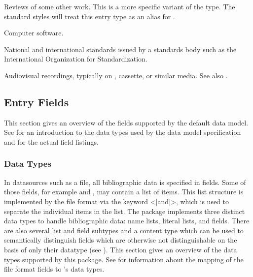 \documentclass{ltxdockit}[2011/03/25]
\begin{document}
\begin{typelist}

Reviews of some other work. This is a more specific variant of the  type. The standard styles will treat this entry type as an alias for .


Computer software.


National and international standards issued by a standards body such as the International Organization for Standardization.


Audiovisual recordings, typically on ,  cassette, or similar media. See also .

\end{typelist}

\subsection{Entry Fields}
\label{bib:fld}

This section gives an overview of the fields supported by the  default data model. See  for an introduction to the data types used by the data model specification and  for the actual field listings.

\subsubsection{Data Types}
\label{bib:fld:typ}

In datasources such as a  file, all bibliographic data is specified in fields. Some of those fields, for example  and , may contain a list of items. This list structure is implemented by the \bibtex file format via the keyword <|and|>, which is used to separate the individual items in the list. The  package implements three distinct data types to handle bibliographic data: name lists, literal lists, and fields. There are also several list and field subtypes and a content type which can be used to semantically distinguish fields which are otherwise not distinguishable on the basis of only their datatype (see ). This section gives an overview of the data types supported by this package. See  for information about the mapping of the \bibtex file format fields to 's data types.
\end{document}
